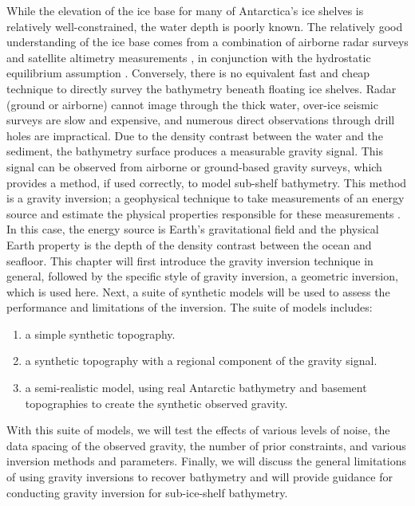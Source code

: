 While the elevation of the ice base for many of Antarctica's ice shelves is relatively well-constrained, the water depth is poorly known. The relatively good understanding of the ice base comes from a combination of airborne radar surveys \citep[e.g.][]{dasmulti2020} and satellite altimetry measurements \citep[e.g.][]{griggsantarctic2011}, in conjunction with the hydrostatic equilibrium assumption \citep{bambercomparison1994}. Conversely, there is no equivalent fast and cheap technique to directly survey the bathymetry beneath floating ice shelves. Radar (ground or airborne) cannot image through the thick water, over-ice seismic surveys are slow and expensive, and numerous direct observations through drill holes are impractical. Due to the density contrast between the water and the sediment, the bathymetry surface produces a measurable gravity signal. This signal can be observed from airborne or ground-based gravity surveys, which provides a method, if used correctly, to model sub-shelf bathymetry. This method is a gravity inversion; a geophysical technique to take measurements of an energy source and estimate the physical properties responsible for these measurements \citep[e.g.,][]{oldenburginversion2005, tarantolainverse2005, menkegeophysical2012}. In this case, the energy source is Earth’s gravitational field and the physical Earth property is the depth of the density contrast between the ocean and seafloor. This chapter will first introduce the gravity inversion technique in general, followed by the specific style of gravity inversion, a geometric inversion, which is used here. Next, a suite of synthetic models will be used to assess the performance and limitations of the inversion. The suite of models includes:
\begin{enumerate}
    \item a simple synthetic topography.
    \item a synthetic topography with a regional component of the gravity signal.
    \item a semi-realistic model, using real Antarctic bathymetry and basement topographies to create the synthetic observed gravity. 
\end{enumerate}

With this suite of models, we will test the effects of various levels of noise, the data spacing of the observed gravity, the number of prior constraints, and various inversion methods and parameters. Finally, we will discuss the general limitations of using gravity inversions to recover bathymetry and will provide guidance for conducting gravity inversion for sub-ice-shelf bathymetry. 

